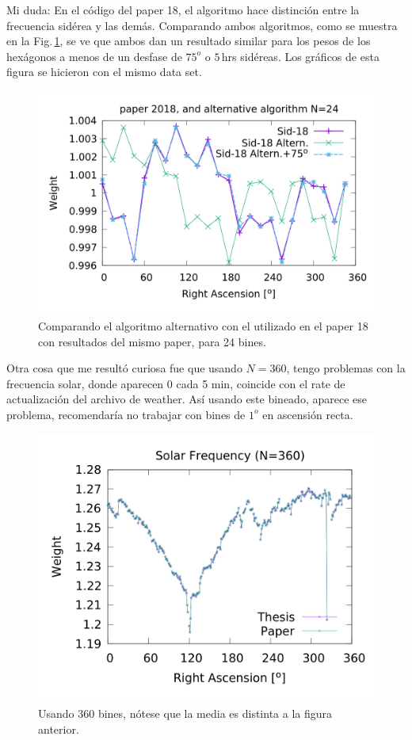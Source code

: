 	Mi duda: En el código del paper 18, el algoritmo hace distinción entre la frecuencia sidérea y las demás. Comparando ambos algoritmos, como se muestra en la Fig.\,\ref{fig:alter_24}, se ve que ambos dan un resultado similar para los pesos de los hexágonos a menos de un desfase de $75^o$ o $5\,$hrs sidéreas. Los gráficos de esta figura se hicieron con el mismo data set.

	\begin{figure}[H]
	\centering
	\includegraphics[width=0.8\linewidth]{Graficos/sidereal_paper_in_24_w_alter.png}
	\caption{Comparando el algoritmo alternativo con el utilizado en el paper 18 con resultados del mismo paper, para 24 bines.}
	\label{fig:alter_24}
	\end{figure}


	Otra cosa que me resultó curiosa fue que usando $N=360$, tengo problemas con la frecuencia solar, donde aparecen 0 cada 5 min, coincide con el rate de actualización del archivo de weather. Así usando este bineado, aparece ese problema, recomendaría no trabajar con bines de $1^o$ en ascensión recta.
	\begin{figure}[H]
	\centering
	\includegraphics[width=0.8\linewidth]{Graficos/solar_my_and_paper_in_360_2.png}
	\caption{Usando 360 bines, nótese que la media es distinta a la figura anterior.}
	\label{fig:solar_360}
	\end{figure}

